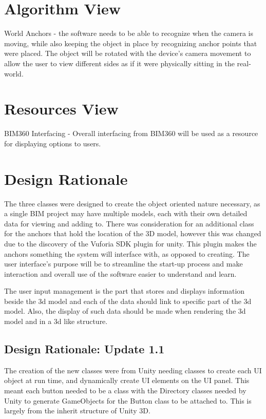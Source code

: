 \documentclass[onecolumn, draftclsnofoot,10pt, compsoc]{IEEEtran}
\begin{document}
\section{Algorithm View}
World Anchors - the software needs to be able to recognize when the camera is moving, while also keeping the object in place by recognizing anchor points that were placed. The object will be rotated with the device's camera movement to allow the user to view different sides as if it were physically sitting in the real-world.

\section{Resources View}
BIM360 Interfacing - Overall interfacing from BIM360 will be used as a resource for displaying options to users.

\section{Design Rationale}
The three classes were designed to create the object oriented nature necessary, as a single BIM project may have multiple models, each with their own detailed data for viewing and adding to. There was consideration for an additional class for the anchors that hold the location of the 3D model, however this was changed due to the discovery of the Vuforia SDK plugin for unity. This plugin makes the anchors something the system will interface with, as opposed to creating. The user interface's purpose will be to streamline the start-up process and make interaction and overall use of the software easier to understand and learn. 

The user input management is the part that stores and displays information beside the 3d model and each of the data should link to specific part of the 3d model. Also, the display of such data should be made when rendering the 3d model and in a 3d like structure.\par

\subsection{Design Rationale: Update 1.1}
The creation of the new classes were from Unity needing classes to create each UI object at run time, and dynamically create UI elements on the UI panel.
This meant each button needed to be a class with the Directory classes needed by Unity to generate GameObjects for the Button class to be attached to.
This is largely from the inherit structure of Unity 3D.\par
\end{document}
